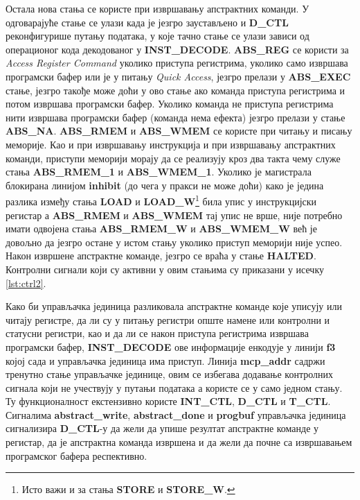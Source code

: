 Остала нова стања се користе при извршавању апстрактних команди. У одговарајуће стање се улази када је језгро заустављено и \textbf{D\_CTL}
реконфигурише путању података, у које тачно стање се улази зависи од операционог кода декодованог у \textbf{INST\_DECODE}. \textbf{ABS\_REG} се користи за \textit{Access Register Command} уколико приступа регистрима, уколико само извршава програмски бафер или је у питању \textit{Quick Access}, језгро прелази у \textbf{ABS\_EXEC} стање, језгро такође може доћи у ово стање ако команда приступа регистрима и потом извршава програмски бафер. Уколико команда не приступа регистрима нити извршава програмски бафер (команда нема ефекта) језгро прелази у стање \textbf{ABS\_NA}. \textbf{ABS\_RMEM} и \textbf{ABS\_WMEM} се користе при читању и писању меморије. Као и при извршавању инструкција и при извршавању апстрактних команди, приступи меморији морају да се реализују кроз два такта чему служе стања \textbf{ABS\_RMEM\_1} и \textbf{ABS\_WMEM\_1}. Уколико је магистрала блокирана линијом \textbf{inhibit} (до чега у пракси не може доћи) како је једина разлика између стања \textbf{LOAD} и \textbf{LOAD\_W}\footnote{Исто важи и за стања \textbf{STORE} и \textbf{STORE\_W}.} била упис у инструкцијски регистар а \textbf{ABS\_RMEM} и \textbf{ABS\_WMEM} тај упис не врше, није потребно имати одвојена стања \textbf{ABS\_RMEM\_W} и \textbf{ABS\_WMEM\_W} већ је довољно да језгро остане у истом стању уколико приступ меморији није успео. Након извршене апстрактне команде, језгро се враћа у стање \textbf{HALTED}. Контролни сигнали који су активни у овим стањима су приказани у исечку \ref{lst:ctrl2}.\newpage

Како би управљачка јединица разликовала апстрактне команде које уписују или читају регистре, да ли су у питању регистри опште намене или контролни и статусни регистри, као и да ли се након приступа регистрима извршава програмски бафер, \textbf{INST\_DECODE} ове информације енкодује у линији \textbf{f3} којој сада и управљачка јединица има приступ. Линија \textbf{mcp\_addr} садржи тренутно стање управљачке јединице, овим се избегава додавање контролних сигнала који не учествују у путањи података а користе се у само једном стању. Ту функционалност екстензивно користе \textbf{INT\_CTL}, \textbf{D\_CTL} и \textbf{T\_CTL}. Сигналима \textbf{abstract\_write}, \textbf{abstract\_done} и \textbf{progbuf} управљачка јединица сигнализира \textbf{D\_CTL}-у да жели да упише резултат апстрактне команде у регистар, да је апстрактна команда извршена и да жели да почне са извршавањем програмског бафера респективно.

